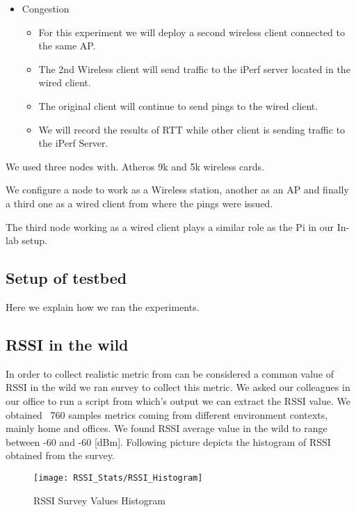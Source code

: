 \begin{itemize}
	
	
	\item Congestion
	\begin{itemize}
		\item For this experiment we will deploy a second wireless client connected to the same AP.
		\item The 2nd Wireless client will send traffic to the iPerf server located in the wired client.
		\item The original client will continue to send pings to the wired client.
		\item We will record the results of RTT while other client is sending traffic to the iPerf Server.
		
	\end{itemize}
	
	
\end{itemize}


We used three nodes with.
Atheros 9k and 5k wireless cards.

We configure a node to work as a Wireless station, another as an AP and finally a third one as a wired client from where the pings were issued.

The third node working as a wired client plays a similar role as the Pi in our In-lab setup.


\subsection{Setup of testbed}

Here we explain how we ran the experiments.

\subsection{RSSI in the wild}

In order to collect realistic metric from can be considered a common value of RSSI in the wild we ran survey to collect this metric. We asked our colleagues in our office to run a script from which's output we can extract the RSSI value. We obtained ~760 samples metrics coming from different environment contexts,  mainly home and offices. We found RSSI average value in the wild to range between -60 and -60 [dBm]. Following picture depicts the histogram of RSSI obtained from the survey.

\begin{figure}[h]
	\centering
	\texttt{[image: RSSI\_Stats/RSSI\_Histogram]}
	\caption{RSSI Survey Values Histogram}
	\label{fig:vSDN_Controller_DC}
\end{figure}


